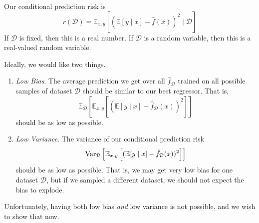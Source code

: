   \begin{lemma} 
    Our conditional prediction risk is 
    \begin{equation}
      r(\mathcal{D}) = \mathbb{E}_{x, y} \left[ (\mathbb{E}[y \mid x] - \hat{f}(x))^2 \mid \mathcal{D} \right]
    \end{equation}
    If $\mathcal{D}$ is fixed, then this is a real number. If $\mathcal{D}$ is a random variable, then this is a real-valued random variable. 
  \end{lemma} 

  Ideally, we would like two things. 
  \begin{enumerate}
    \item \textit{Low Bias}. The average prediction we get over all $\hat{f}_{\mathcal{D}}$ trained on all possible samples of dataset $\mathcal{D}$ should be similar to our best regressor. That is, 
    \begin{equation}
      \mathbb{E}_{\mathcal{D}} \left[ \mathbb{E}_{x, y} \left[ (\mathbb{E}[y \mid x] - \hat{f}_{\mathcal{D}}(x))^2 \right] \right]
    \end{equation}
    should be as low as possible. 

    \item \textit{Low Variance}. The variance of our conditional prediction risk  
    \begin{equation}
      \Var_{\mathcal{D}} \left[ \mathbb{E}_{x, y} \left[ (\mathbb{E}[y \mid x] - \hat{f}_{\mathcal{D}}(x))^2 \right] \right]
    \end{equation}
    should be as low as possible. That is, we may get very low bias for one dataset $\mathcal{D}$, but if we sampled a different dataset, we should not expect the bias to explode. 
  \end{enumerate}

  Unfortunately, having both low bias \textit{and} low variance is not possible, and we wish to show that now. 

